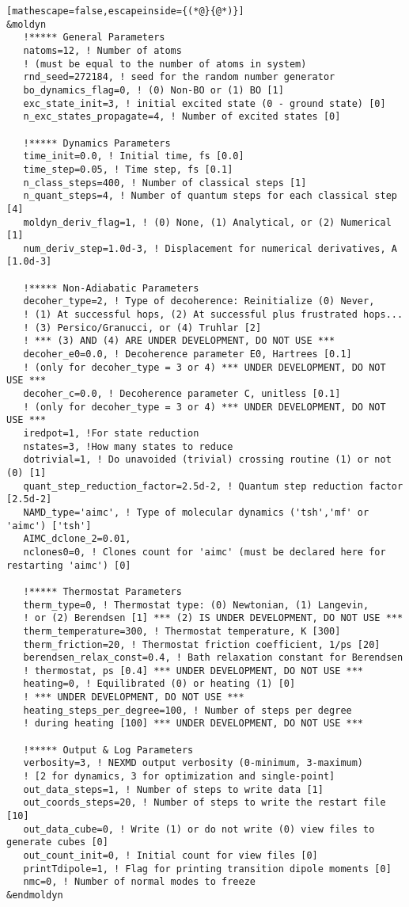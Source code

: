 \begin{lstlisting}[mathescape=false,escapeinside={(*@}{@*)}]
&moldyn
   !***** General Parameters
   natoms=12, ! Number of atoms
   ! (must be equal to the number of atoms in system)
   rnd_seed=272184, ! seed for the random number generator
   bo_dynamics_flag=0, ! (0) Non-BO or (1) BO [1]
   exc_state_init=3, ! initial excited state (0 - ground state) [0]
   n_exc_states_propagate=4, ! Number of excited states [0]

   !***** Dynamics Parameters
   time_init=0.0, ! Initial time, fs [0.0]
   time_step=0.05, ! Time step, fs [0.1]
   n_class_steps=400, ! Number of classical steps [1]
   n_quant_steps=4, ! Number of quantum steps for each classical step [4]
   moldyn_deriv_flag=1, ! (0) None, (1) Analytical, or (2) Numerical [1]
   num_deriv_step=1.0d-3, ! Displacement for numerical derivatives, A [1.0d-3]

   !***** Non-Adiabatic Parameters
   decoher_type=2, ! Type of decoherence: Reinitialize (0) Never,
   ! (1) At successful hops, (2) At successful plus frustrated hops...
   ! (3) Persico/Granucci, or (4) Truhlar [2]
   ! *** (3) AND (4) ARE UNDER DEVELOPMENT, DO NOT USE ***
   decoher_e0=0.0, ! Decoherence parameter E0, Hartrees [0.1]
   ! (only for decoher_type = 3 or 4) *** UNDER DEVELOPMENT, DO NOT USE ***
   decoher_c=0.0, ! Decoherence parameter C, unitless [0.1]
   ! (only for decoher_type = 3 or 4) *** UNDER DEVELOPMENT, DO NOT USE ***
   iredpot=1, !For state reduction
   nstates=3, !How many states to reduce
   dotrivial=1, ! Do unavoided (trivial) crossing routine (1) or not (0) [1]
   quant_step_reduction_factor=2.5d-2, ! Quantum step reduction factor [2.5d-2]
   NAMD_type='aimc', ! Type of molecular dynamics ('tsh','mf' or 'aimc') ['tsh']
   AIMC_dclone_2=0.01,
   nclones0=0, ! Clones count for 'aimc' (must be declared here for restarting 'aimc') [0]

   !***** Thermostat Parameters
   therm_type=0, ! Thermostat type: (0) Newtonian, (1) Langevin,
   ! or (2) Berendsen [1] *** (2) IS UNDER DEVELOPMENT, DO NOT USE ***
   therm_temperature=300, ! Thermostat temperature, K [300]
   therm_friction=20, ! Thermostat friction coefficient, 1/ps [20]
   berendsen_relax_const=0.4, ! Bath relaxation constant for Berendsen
   ! thermostat, ps [0.4] *** UNDER DEVELOPMENT, DO NOT USE ***
   heating=0, ! Equilibrated (0) or heating (1) [0]
   ! *** UNDER DEVELOPMENT, DO NOT USE ***
   heating_steps_per_degree=100, ! Number of steps per degree
   ! during heating [100] *** UNDER DEVELOPMENT, DO NOT USE ***

   !***** Output & Log Parameters
   verbosity=3, ! NEXMD output verbosity (0-minimum, 3-maximum)
   ! [2 for dynamics, 3 for optimization and single-point]
   out_data_steps=1, ! Number of steps to write data [1]
   out_coords_steps=20, ! Number of steps to write the restart file [10]
   out_data_cube=0, ! Write (1) or do not write (0) view files to generate cubes [0]
   out_count_init=0, ! Initial count for view files [0]
   printTdipole=1, ! Flag for printing transition dipole moments [0]
   nmc=0, ! Number of normal modes to freeze
&endmoldyn


\end{lstlisting}
